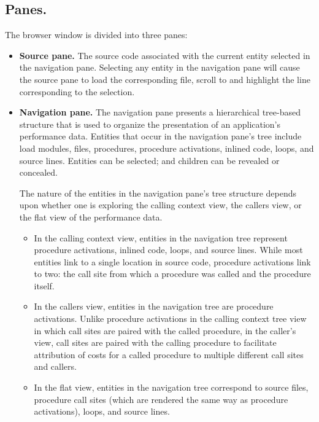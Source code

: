 \documentclass[english]{article}
\begin{document}
\subsection{Panes.}

The browser window is divided into three panes:

\begin{itemize}
  \item \textbf{Source pane.} The source code associated with the current entity selected in the navigation pane.
Selecting any entity in the navigation pane will cause the source pane to load the corresponding file, scroll to and highlight the line corresponding to the selection.

\item \textbf{Navigation pane.}
The navigation pane presents a hierarchical tree-based structure that is used to organize the presentation of an application's performance data.
Entities that occur in the navigation pane's tree include load modules, files, procedures, procedure activations, inlined code, loops, and source lines.
Entities can be selected; and children can be revealed or concealed.

The nature of the entities in the navigation pane's tree structure depends upon whether one is exploring the calling context view, the callers view, or the flat view of the performance data. 

\begin{itemize}
\item In the calling context view, entities in the navigation tree represent procedure activations, inlined code, loops, and source lines. 
While most entities link to a single location in source code, procedure activations link to two: the call site from which a procedure was called and the procedure itself.
\item In the callers view, entities in the navigation tree are procedure activations. Unlike procedure activations in the calling context tree view in which call sites are paired with the called procedure, in the caller's view, call sites are paired with the calling procedure to facilitate attribution of costs for a called procedure to multiple different call sites and callers.
\item In the flat view, entities in the navigation tree correspond to source files, procedure call sites (which are rendered the same way as procedure activations), loops, and source lines.
\end{itemize}



\end{itemize}
\end{document}
